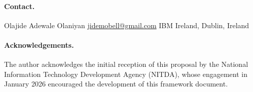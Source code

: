 \documentclass[11pt]{article}
\begin{document}
\vspace{8pt}
\paragraph{Contact.}
Olajide Adewale Olaniyan \quad\textbar\quad
\href{mailto:jidemobell@gmail.com}{jidemobell@gmail.com} \quad\textbar\quad
IBM Ireland, Dublin, Ireland

\paragraph{Acknowledgements.}
The author acknowledges the initial reception of this proposal
by the National Information Technology Development Agency (NITDA),
whose engagement in January 2026 encouraged the development of this
framework document.



\end{document}
